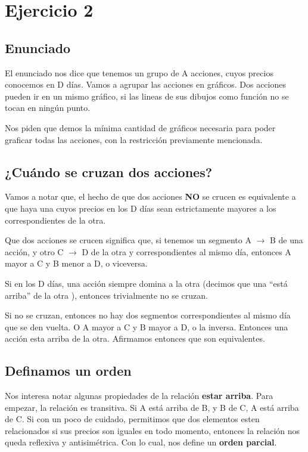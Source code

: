 \section{Ejercicio 2}

\subsection{Enunciado}

\par{El enunciado nos dice que tenemos un grupo de A acciones, cuyos precios conocemos en D días. 
Vamos a agrupar las acciones en gráficos. Dos acciones pueden ir en un mismo gráfico, si las lineas de sus dibujos
como función no se tocan en ningún punto.}
\par{Nos piden que demos la mínima cantidad de gráficos necesaria para poder graficar todas las acciones, con 
la restricción previamente mencionada.} 

\subsection{¿Cuándo se cruzan dos acciones?}

\par{Vamos a notar que, el hecho de que dos acciones \textbf{NO} se crucen es equivalente a que 
haya una cuyos precios en los D días sean estrictamente mayores a los correspondientes de la otra.}

\par{Que dos acciones se crucen significa que, si tenemos un segmento A $\rightarrow$ B de una acción, 
y otro C $\rightarrow$ D de la otra y correspondientes al mismo día,  entonces A mayor a C y B menor a D, o viceversa.} 

\par{Si en los D días, una acción siempre domina a la otra (decimos que una ``está arriba'' de la otra ), entonces trivialmente no se cruzan.}

\par{Si no se cruzan, entonces no hay dos segmentos correspondientes al mismo día que se den vuelta. 
O A mayor a C y B mayor a D, o la inversa. Entonces una acción esta arriba de la otra. Afirmamos entonces que son equivalentes.}

\subsection{Definamos un orden}

\par{Nos interesa notar algunas propiedades de la relación \textbf{estar arriba}. Para empezar, 
la relación es transitiva. Si A está arriba de B, y B de C, A está arriba de C.
Si con un poco de cuidado, permitimos que dos elementos esten relacionados si sus precios son iguales en todo momento, entonces
la relación nos queda reflexiva y antisimétrica. Con lo cual, nos define un \textbf{orden parcial}. }

